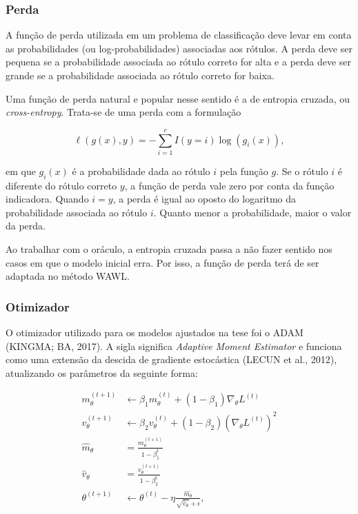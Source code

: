 \documentclass[12pt,twoside,brazilian]{book}
\begin{document}
\hypertarget{perda}{%
\subsubsection{Perda}\label{perda}}

A função de perda utilizada em um problema de classificação deve levar
em conta as probabilidades (ou log-probabilidades) associadas aos
rótulos. A perda deve ser pequena se a probabilidade associada ao rótulo
correto for alta e a perda deve ser grande se a probabilidade associada
ao rótulo correto for baixa.

Uma função de perda natural e popular nesse sentido é a de entropia
cruzada, ou \emph{cross-entropy}. Trata-se de uma perda com a formulação

\[
\ell(g(x), y) = -\sum_{i=1}^c I(y=i)\log(g_i(x)),
\]

em que \(g_i(x)\) é a probabilidade dada ao rótulo \(i\) pela função
\(g\). Se o rótulo \(i\) é diferente do rótulo correto \(y\), a função
de perda vale zero por conta da função indicadora. Quando \(i=y\), a
perda é igual ao oposto do logaritmo da probabilidade associada ao
rótulo \(i\). Quanto menor a probabilidade, maior o valor da perda.

Ao trabalhar com o oráculo, a entropia cruzada passa a não fazer sentido
nos casos em que o modelo inicial erra. Por isso, a função de perda terá
de ser adaptada no método WAWL.

\hypertarget{sec-otimizador}{%
\subsubsection{Otimizador}\label{sec-otimizador}}

O otimizador utilizado para os modelos ajustados na tese foi o ADAM
(KINGMA; BA, 2017). A sigla significa \emph{Adaptive Moment Estimator} e
funciona como uma extensão da descida de gradiente estocástica (LECUN et
al., 2012), atualizando os parâmetros da seguinte forma:

\[
\begin{array}{cl}
m_{\theta}^{(t+1)} &\leftarrow \beta_1m_{\theta}^{(t)} + (1-\beta_1)\nabla_\theta L^{(t)} \\
v_{\theta}^{(t+1)} &\leftarrow \beta_2v_{\theta}^{(t)} + (1-\beta_2)(\nabla_\theta L^{(t)})^2 \\
\hat{m}_{\theta} &= \frac{m_\theta^{(t+1)}}{1-\beta_1^t} \\
\hat{v}_{\theta} &= \frac{v_\theta^{(t+1)}}{1-\beta_2^t} \\
\theta^{(t+1)} &\leftarrow \theta^{(t)} - \eta \frac{\hat{m}_{\theta}}{\sqrt{\hat{v}_{\theta}} + \epsilon},
\end{array}
\]
\end{document}
